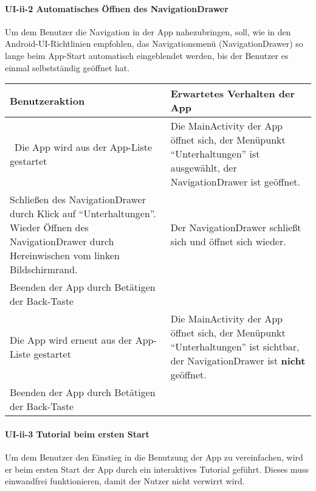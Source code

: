 \paragraph{UI-ii-2 Automatisches Öffnen des NavigationDrawer}

Um dem Benutzer die Navigation in der App nahezubringen, soll, wie in den Android-UI-Richtlinien empfohlen, das Navigationsmenü (NavigationDrawer) so lange beim App-Start automatisch eingeblendet werden, bis der Benutzer es einmal selbstständig geöffnet hat.

\begin{longtable}{|p{8cm}|p{8.5cm}|}
\hline
Benutzeraktion & Erwartetes Verhalten der App\tabularnewline
\hline

~Die App wird aus der App-Liste gestartet & Die MainActivity der App
öffnet sich, der Menüpunkt ``Unterhaltungen'' ist ausgewählt, der
NavigationDrawer ist geöffnet.\tabularnewline
Schließen des NavigationDrawer durch Klick auf ``Unterhaltungen''.
Wieder Öffnen des NavigationDrawer durch Hereinwischen vom linken
Bildschirmrand. & Der NavigationDrawer schließt sich und öffnet sich
wieder.\tabularnewline
Beenden der App durch Betätigen der Back-Taste &\tabularnewline
Die App wird erneut aus der App-Liste gestartet & Die MainActivity der
App öffnet sich, der Menüpunkt ``Unterhaltungen'' ist sichtbar, der
NavigationDrawer ist \textbf{nicht} geöffnet.\tabularnewline
Beenden der App durch Betätigen der Back-Taste &\tabularnewline
\hline
\end{longtable}

\paragraph{UI-ii-3 Tutorial beim ersten Start}

Um dem Benutzer den Einstieg in die Benutzung der App zu vereinfachen,
wird er beim ersten Start der App durch ein interaktives Tutorial
geführt. Dieses muss einwandfrei funktionieren, damit der Nutzer nicht
verwirrt wird.


